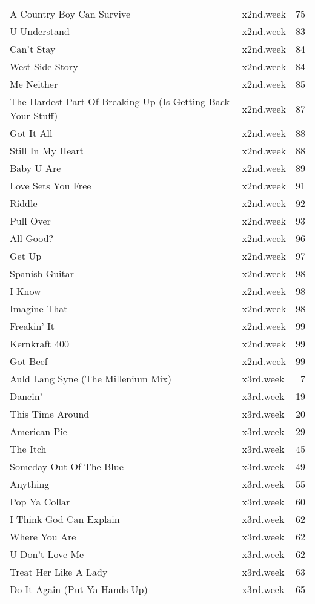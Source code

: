 \begin{table}[ht]
\begin{tabular}{llr}
  A Country Boy Can Survive & x2nd.week &  75 \\ 
  U Understand & x2nd.week &  83 \\ 
  Can't Stay & x2nd.week &  84 \\ 
  West Side Story & x2nd.week &  84 \\ 
  Me Neither & x2nd.week &  85 \\ 
  The Hardest Part Of Breaking Up (Is Getting Back Your Stuff) & x2nd.week &  87 \\ 
  Got It All & x2nd.week &  88 \\ 
  Still In My Heart & x2nd.week &  88 \\ 
  Baby U Are & x2nd.week &  89 \\ 
  Love Sets You Free & x2nd.week &  91 \\ 
  Riddle & x2nd.week &  92 \\ 
  Pull Over & x2nd.week &  93 \\ 
  All Good? & x2nd.week &  96 \\ 
  Get Up & x2nd.week &  97 \\ 
  Spanish Guitar & x2nd.week &  98 \\ 
  I Know & x2nd.week &  98 \\ 
  Imagine That & x2nd.week &  98 \\ 
  Freakin' It & x2nd.week &  99 \\ 
  Kernkraft 400 & x2nd.week &  99 \\ 
  Got Beef & x2nd.week &  99 \\ 
  Auld Lang Syne (The Millenium Mix) & x3rd.week &   7 \\ 
  Dancin' & x3rd.week &  19 \\ 
  This Time Around & x3rd.week &  20 \\ 
  American Pie & x3rd.week &  29 \\ 
  The Itch & x3rd.week &  45 \\ 
  Someday Out Of The Blue & x3rd.week &  49 \\ 
  Anything & x3rd.week &  55 \\ 
  Pop Ya Collar & x3rd.week &  60 \\ 
  I Think God Can Explain & x3rd.week &  62 \\ 
  Where You Are & x3rd.week &  62 \\ 
  U Don't Love Me & x3rd.week &  62 \\ 
  Treat Her Like A Lady & x3rd.week &  63 \\ 
  Do It Again (Put Ya Hands Up) & x3rd.week &  65 \\ 

\end{tabular}
\end{table}

